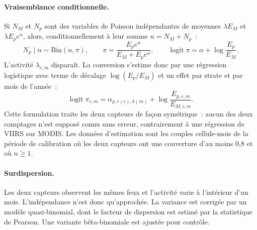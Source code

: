 \documentclass[11pt,a4paper]{article}
\DeclareMathOperator{\logit}{logit}
\begin{document}
\paragraph{Vraisemblance conditionnelle.} Si $N_M$ et $N_p$ sont des variables de Poisson indépendantes de moyennes $\lambda E_M$ et $\lambda E_p e^{\alpha}$, alors, conditionnellement à leur somme $n = N_M + N_p$~:
\begin{equation}
  N_p \mid n \sim \mathrm{Bin}(n, \pi), \qquad \pi = \frac{E_p e^{\alpha}}{E_M + E_p e^{\alpha}}, \qquad \logit \pi = \alpha + \log\frac{E_p}{E_M}.
  \label{eq:binom}
\end{equation}
L'activité $\lambda_{c,m}$ disparaît. La conversion s'estime donc par une régression logistique avec terme de décalage $\log(E_p/E_M)$ et un effet par strate et par mois de l'année~:
\begin{equation}
  \logit \pi_{c,m} = \alpha_{p,r(c),k(m)} + \log\frac{E_{p,c,m}}{E_{M,c,m}}.
  \label{eq:logit}
\end{equation}
Cette formulation traite les deux capteurs de façon symétrique~: aucun des deux comptages n'est supposé connu sans erreur, contrairement à une régression de VIIRS sur MODIS. Les données d'estimation sont les couples cellule-mois de la période de calibration où les deux capteurs ont une couverture d'au moins 0,8 et où $n \ge 1$.

\paragraph{Surdispersion.} Les deux capteurs observent les mêmes feux et l'activité varie à l'intérieur d'un mois. L'indépendance n'est donc qu'approchée. La variance est corrigée par un modèle quasi-binomial, dont le facteur de dispersion est estimé par la statistique de Pearson. Une variante bêta-binomiale est ajustée pour contrôle.
\end{document}
